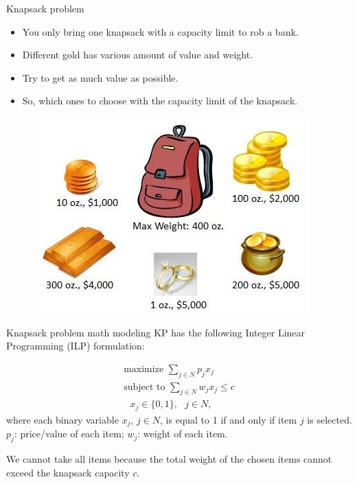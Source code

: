 \documentclass[xcolor=dvipsnames,aspectratio=169]{beamer}
\begin{document}
\begin{frame}{Knapsack problem}
\begin{itemize}
    \item You only bring one knapsack with a capacity 
    limit to rob a bank. 
    \item Different gold has various amount of 
    value and weight.
    \item Try to get as much value as possible.
    \item So, which ones to choose with the capacity limit of the 
    knapsack. 
\end{itemize}

\begin{figure}
\centering

\vspace*{-0.5cm}
\includegraphics[scale=0.6]{knapsack-problem.png}

\end{figure}
\end{frame}


\begin{frame}{Knapsack problem math modeling}
KP has the
following Integer Linear Programming (ILP) formulation:

\begin{gather}
\text{maximize \ \ \ }\sum_{j\in N}p_{j}x_{j}\text{ \ \ \ \ \ \ \ }
\label{eq:ILP1} \\
\text{subject to \ \ }\sum_{j\in N}w_{j}x_{j}\leq c  \label{eq:ILP2} \\
\text{ \ \ \ \ \ \ \ \ \ \ \ \ \ \ \ \ \ \ \ \ \ \ \ \ \ }x_{j}\in \{0,1\},%
\text{ \ \ }j\in N,  \label{eq:ILP3}
\end{gather}%
where each binary variable $x_{j}$, $j\in N$, is equal to 1 if and only if
item $j$ is selected.
$p_{j}$: price/value of each item; $w_{j}$: weight of each 
item. 

We cannot take all items because the total
weight of the chosen items cannot exceed the knapsack 
capacity $c$.
    
\end{frame}
\end{document}
